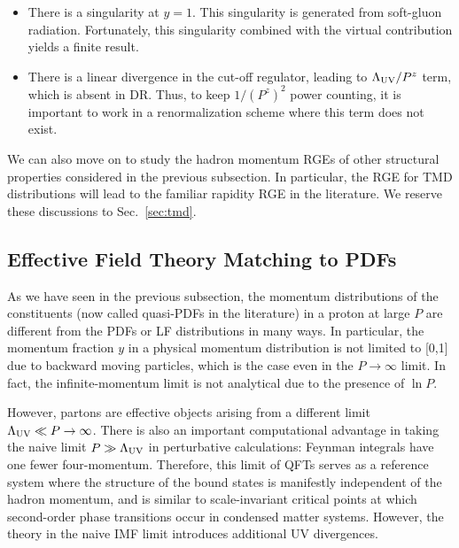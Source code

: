 \documentclass[aps,rmp,reprint,amsmath,amssymb,graphicx,longbibliography]{revtex4-1} %
\DeclareRobustCommand{\sec}[1]{Sec.~\ref{sec:#1}}
\begin{document}
\begin{itemize}
	\item{There is a singularity at $y=1$. This singularity is generated
		from soft-gluon radiation. Fortunately, this singularity combined
		with the virtual contribution yields a finite result.}
	
	\item{There is a linear divergence in the cut-off regulator,
		leading to $\Lambda_{\rm UV}/P^z$ term, which is absent in DR. Thus, to keep $1/(P^z)^2$
		power counting, it is important
		to work in a renormalization scheme where this term does not exist.}
	
\end{itemize}

We can also move on to study the hadron momentum RGEs of other
structural properties considered in the previous subsection.
In particular, the RGE for TMD distributions will lead to
the familiar rapidity RGE in the literature. We reserve these discussions to \sec{tmd}.

\subsection{Effective Field Theory Matching to PDFs}
\label{sec:lamet-fact}
As we have seen in the previous subsection,
the momentum distributions of the constituents (now
called quasi-PDFs in the literature) in a proton at large $P$
are different from the PDFs or LF distributions in many ways.
In particular, the momentum fraction $y$ in a physical momentum distribution
is not limited to [0,1] due to backward moving particles,
which is the case even in the $P\to\infty$ limit. In fact, the
infinite-momentum limit is not analytical due to the presence of $\ln P$.

However, partons are effective objects arising
from a different limit $\Lambda_{\rm UV}\ll P\to \infty $.
There is also an important computational advantage in taking the naive limit $P\gg \Lambda_{\rm UV}$ in
perturbative calculations: Feynman integrals have one fewer four-momentum.
Therefore, this limit of QFTs serves as a
reference system where the structure of the bound states
is manifestly {independent of the hadron momentum}, and is similar to
scale-invariant critical points at which second-order phase transitions occur
in condensed matter systems. However, the theory in the naive IMF limit
introduces additional UV divergences.
\end{document}
